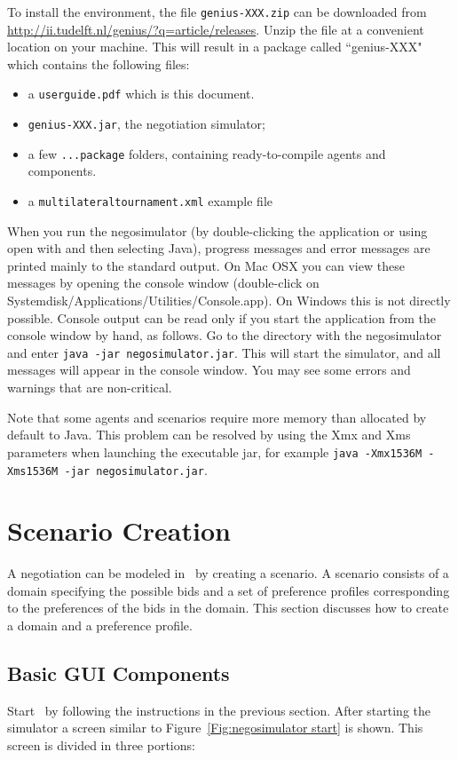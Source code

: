 \documentclass[]{article}
\begin{document}
To install the environment, the file \texttt{genius-XXX.zip} can be downloaded from \url{http://ii.tudelft.nl/genius/?q=article/releases}. Unzip the file at a convenient location on your machine. This will result in a package called ``genius-XXX" which contains the following files:

\begin{itemize}
	\item a  \texttt{userguide.pdf} which is this document.
	\item \texttt{genius-XXX.jar}, the negotiation simulator;
	\item a few \texttt{...package} folders, containing ready-to-compile agents and components.
	\item a \texttt{multilateraltournament.xml} example file
\end{itemize}

When you run the negosimulator (by double-clicking the application or using open with and then selecting Java), progress messages and error messages are printed mainly to the standard output. On Mac OSX you can view these messages by opening the console window (double-click on Systemdisk/Applications/Utilities/Console.app). On Windows this is not directly possible. Console output can be read only if you start the application from the console window by hand, as follows. Go to the directory with the negosimulator and enter
\texttt{java -jar negosimulator.jar}.
This will start the simulator, and all messages will appear in the console window. You may see some errors and warnings that are non-critical.

Note that some agents and scenarios require more memory than allocated by default to Java. This problem can be resolved by using the Xmx and Xms parameters when launching the executable jar, for example \texttt{java -Xmx1536M -Xms1536M -jar negosimulator.jar}.


\section{Scenario Creation}
A negotiation can be modeled in \Genius~by creating a scenario. A scenario consists of a domain specifying the possible bids and a set of preference profiles corresponding to the preferences of the bids in the domain. This section discusses how to create a domain and a preference profile.

\subsection{Basic GUI Components}
Start \Genius~by following the instructions in the previous section. After starting the simulator a screen similar to Figure~\ref{Fig:negosimulator start} is shown. This screen is divided in three portions:
\end{document}
